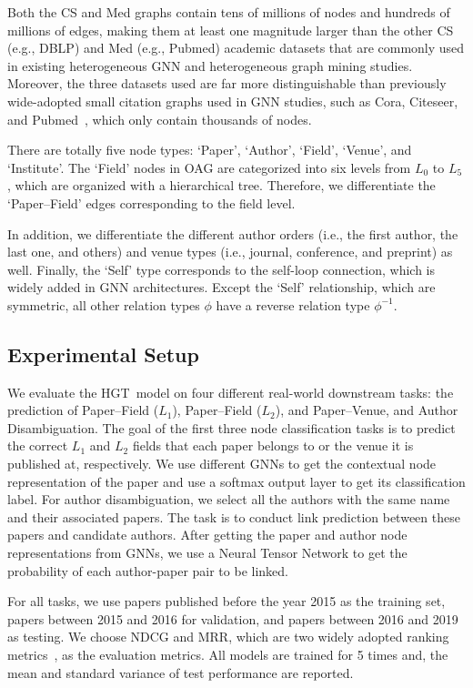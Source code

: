 \documentclass[sigconf]{acmart}
\theoremstyle{definition}
\newcommand{\short}{HGT}
\begin{document}
Both the CS and Med graphs contain tens of millions of nodes and hundreds of millions of edges, making them at least one magnitude larger than the other CS (e.g., DBLP) and Med (e.g., Pubmed) academic datasets that are commonly used in existing heterogeneous GNN and heterogeneous graph mining studies. 
Moreover, the three datasets used are far more distinguishable than previously wide-adopted small citation graphs used in GNN studies, such as Cora, Citeseer, and Pubmed~\cite{gcn,gat}, which only contain thousands of nodes. 


There are totally five node types: `Paper', `Author', `Field', `Venue', and `Institute'. 
The `Field' nodes in OAG are categorized into six levels from $L_0$ to $L_5$, which are organized with a hierarchical tree. Therefore, we differentiate the `Paper--Field' edges corresponding to the field level. 

In addition, we differentiate the different author orders (i.e., the first author, the last one, and others) and venue types (i.e., journal, conference, and preprint) as well. 
Finally, the `Self' type corresponds to the self-loop connection, which is widely added in GNN architectures. 
Except the `Self' relationship, which are symmetric, all other relation types $\phi$ have a reverse relation type $\phi^{-1}$. 


\subsection{Experimental Setup}



We evaluate the \short\ model on four different real-world downstream tasks: the prediction of Paper--Field ($L_1$), Paper--Field ($L_2$), and Paper--Venue, and Author Disambiguation. 
The goal of the first three node classification tasks is to predict the correct $L_1$ and $L_2$ fields that each paper belongs to or the venue it is published at, respectively. 
We use different GNNs to get the contextual node representation of the paper and use a softmax output layer to get its classification label. 
For author disambiguation, we select all the authors with the same name and their associated papers. 
The task is to conduct link prediction between these papers and candidate authors. 
After getting the paper and author node representations from GNNs, we use a Neural Tensor Network to get the probability of each author-paper pair to be linked. 


For all tasks, we use papers published before the year 2015 as the training set, papers between 2015 and 2016 for validation, and papers between 2016 and 2019 as testing. 
We choose NDCG and MRR, which are two widely adopted ranking metrics~\cite{DBLP:books/daglib/0027504, DBLP:series/synthesis/2014Li}, as the evaluation metrics. 
All models are trained for 5 times and, the mean and standard variance of test performance are reported. 
\end{document}
